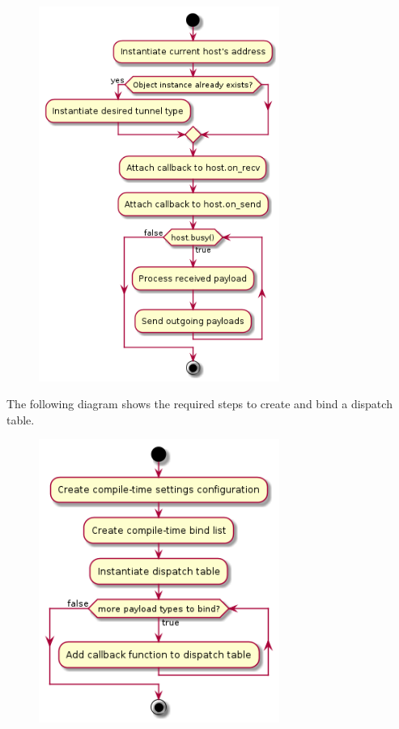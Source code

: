 \documentclass[12pt]{report}
\newcommand{\+}{\discretionary{\mbox{\scriptsize$\hookleftarrow$}}{}{}}
\begin{document}
                \begin{figure}[H]
                \centering
                \includegraphics[width=0.7\textwidth]{d/ac/def_manhost.png}
                \end{figure}





                \newpage
                The following diagram shows the required steps to create and bind a dispatch table.

                \begin{figure}[H]
                \centering
                \includegraphics[width=0.7\textwidth]{d/ac/disptable.png}
                \end{figure}
\end{document}

